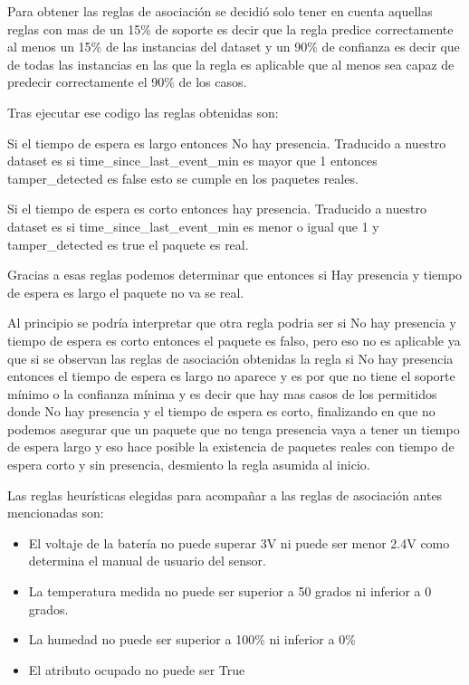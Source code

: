 Para obtener las reglas de asociación se decidió solo tener en cuenta aquellas reglas con mas de un 15\% de soporte es decir que la regla predice correctamente al menos un 15\% de las instancias del dataset y un 90\% de confianza es decir que de todas las instancias en las que la regla es aplicable que al menos sea capaz de predecir correctamente el 90\% de los casos.


Tras ejecutar ese codigo las reglas obtenidas son:


Si el tiempo de espera es largo entonces No hay presencia.
Traducido a nuestro dataset es si time\_since\_last\_event\_min es mayor que 1 entonces tamper\_detected es false esto se cumple en los paquetes reales.

Si el tiempo de espera es corto entonces hay presencia.
Traducido a nuestro dataset es si time\_since\_last\_event\_min es menor o igual que 1 y tamper\_detected es true el paquete es real.

Gracias a esas reglas podemos determinar que entonces si Hay presencia y tiempo de espera es largo el paquete no va se real.

Al principio se podría interpretar que otra regla podria ser si No hay presencia y tiempo de espera es corto entonces el paquete es falso, pero eso no es aplicable ya que si se observan las reglas de asociación obtenidas la regla si No hay presencia entonces el tiempo de espera es largo no aparece y es por que no tiene el soporte mínimo o la confianza mínima y es decir que hay mas casos de los permitidos donde No hay presencia y el tiempo de espera es corto, finalizando en que no podemos asegurar que un paquete que no tenga presencia vaya a tener un tiempo de espera largo y eso hace posible la existencia de paquetes reales con tiempo de espera corto  y sin presencia, desmiento la regla asumida al inicio.


Las reglas heurísticas elegidas para acompañar a las reglas de asociación antes mencionadas son: 

\begin{itemize}
    \item El voltaje de la batería no puede superar 3V ni puede ser menor 2.4V como determina el manual de usuario del sensor.
    \item La temperatura medida no puede ser superior a 50 grados ni inferior a 0 grados.
    \item La humedad no puede ser superior a 100\% ni inferior a 0\%
    \item El atributo ocupado no puede ser True
\end{itemize}

